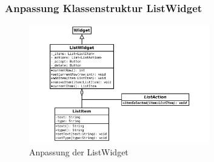 %
%
%
\begin{frame}
	\frametitle{Anpassung Klassenstruktur ListWidget}
%
	\begin{figure}
		\centering
		\includegraphics[width = 0.7\textwidth]{../grafiken/uml-list-widget-2}
		\caption{Anpassung der ListWidget}
	\end{figure}
\end{frame}
%
%
